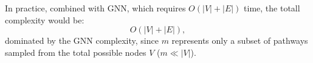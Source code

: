 In practice, combined with GNN, which requires \( O(|V| + |E|) \) time,
the totall complexity would be:
\[
O(|V| + |E|),
\]
dominated by the GNN complexity,
since $m$ represents only a subset of pathways sampled from the total possible nodes \( V \) 
(\(m \ll |V|\)).








